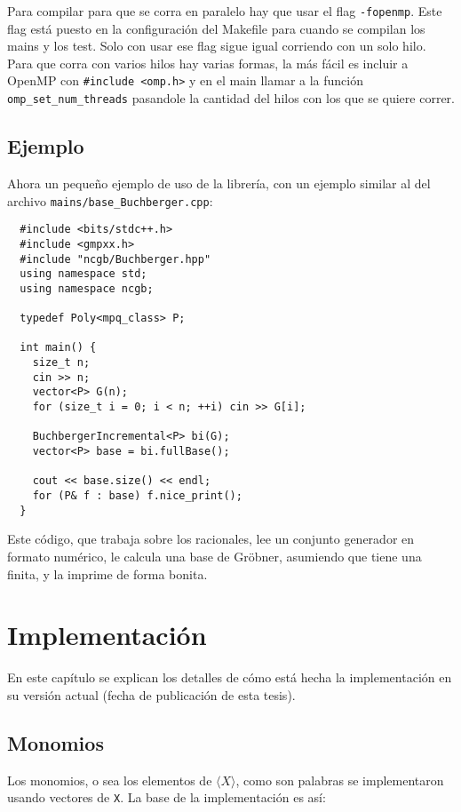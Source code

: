 \documentclass[12pt]{report}
\theoremstyle{customstyle}
\theoremstyle{factstyle}
\begin{document}
Para compilar para que se corra en paralelo hay que usar el flag \texttt{-fopenmp}. Este flag está puesto en la configuración del Makefile para cuando se compilan los mains y los test. Solo con usar ese flag sigue igual corriendo con un solo hilo. Para que corra con varios hilos hay varias formas, la más fácil es incluir a OpenMP con \texttt{\#include <omp.h>} y en el main llamar a la función \texttt{omp\_set\_num\_threads} pasandole la cantidad del hilos con los que se quiere correr.


\section{Ejemplo}

Ahora un pequeño ejemplo de uso de la librería, con un ejemplo similar al del archivo \texttt{mains/base\_Buchberger.cpp}:

\begin{verbatim}
  #include <bits/stdc++.h>
  #include <gmpxx.h>
  #include "ncgb/Buchberger.hpp"
  using namespace std;
  using namespace ncgb;

  typedef Poly<mpq_class> P;

  int main() {
    size_t n;
    cin >> n;
    vector<P> G(n);
    for (size_t i = 0; i < n; ++i) cin >> G[i];

    BuchbergerIncremental<P> bi(G);
    vector<P> base = bi.fullBase();

    cout << base.size() << endl;
    for (P& f : base) f.nice_print();
  }
\end{verbatim}

Este código, que trabaja sobre los racionales, lee un conjunto generador en formato numérico, le calcula una base de Gröbner, asumiendo que tiene una finita, y la imprime de forma bonita.


\chapter{Implementación}

En este capítulo se explican los detalles de cómo está hecha la implementación en su versión actual (fecha de publicación de esta tesis).

\section{Monomios}

Los monomios, o sea los elementos de $⟨X⟩$, como son palabras se implementaron usando vectores de \texttt{X}. La base de la implementación es así:
\end{document}
